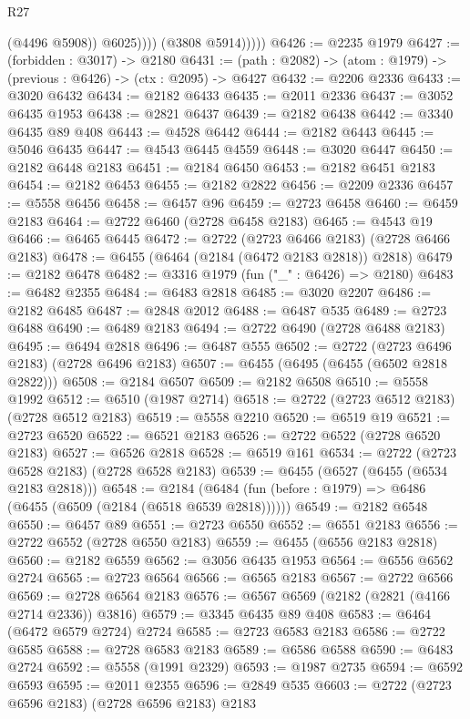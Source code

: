 \begin{lexlean}{R27}
\begin{coremodule}
                      (@4496 @5908))
                    @6025))))
            (@3808 @5914)))))
@6426 := @2235 @1979
@6427 := (forbidden : @3017) -> @2180
@6431 := (path : @2082) -> (atom : @1979) -> (previous : @6426) -> (ctx : @2095) -> @6427
@6432 := @2206 @2336
@6433 := @3020 @6432
@6434 := @2182 @6433
@6435 := @2011 @2336
@6437 := @3052 @6435 @1953
@6438 := @2821 @6437
@6439 := @2182 @6438
@6442 := @3340 @6435 @89 @408
@6443 := @4528 @6442
@6444 := @2182 @6443
@6445 := @5046 @6435
@6447 := @4543 @6445 @4559
@6448 := @3020 @6447
@6450 := @2182 @6448 @2183
@6451 := @2184 @6450
@6453 := @2182 @6451 @2183
@6454 := @2182 @6453
@6455 := @2182 @2822
@6456 := @2209 @2336
@6457 := @5558 @6456
@6458 := @6457 @96
@6459 := @2723 @6458
@6460 := @6459 @2183
@6464 := @2722 @6460 (@2728 @6458 @2183)
@6465 := @4543 @19
@6466 := @6465 @6445
@6472 := @2722 (@2723 @6466 @2183) (@2728 @6466 @2183)
@6478 := @6455 (@6464 (@2184 (@6472 @2183 @2818)) @2818)
@6479 := @2182 @6478
@6482 := @3316 @1979 (fun ("_" : @6426) => @2180)
@6483 := @6482 @2355
@6484 := @6483 @2818
@6485 := @3020 @2207
@6486 := @2182 @6485
@6487 := @2848 @2012
@6488 := @6487 @535
@6489 := @2723 @6488
@6490 := @6489 @2183
@6494 := @2722 @6490 (@2728 @6488 @2183)
@6495 := @6494 @2818
@6496 := @6487 @555
@6502 := @2722 (@2723 @6496 @2183) (@2728 @6496 @2183)
@6507 := @6455 (@6495 (@6455 (@6502 @2818 @2822)))
@6508 := @2184 @6507
@6509 := @2182 @6508
@6510 := @5558 @1992
@6512 := @6510 (@1987 @2714)
@6518 := @2722 (@2723 @6512 @2183) (@2728 @6512 @2183)
@6519 := @5558 @2210
@6520 := @6519 @19
@6521 := @2723 @6520
@6522 := @6521 @2183
@6526 := @2722 @6522 (@2728 @6520 @2183)
@6527 := @6526 @2818
@6528 := @6519 @161
@6534 := @2722 (@2723 @6528 @2183) (@2728 @6528 @2183)
@6539 := @6455 (@6527 (@6455 (@6534 @2183 @2818)))
@6548 := @2184 (@6484 (fun (before : @1979) => @6486 (@6455 (@6509 (@2184 (@6518 @6539 @2818))))))
@6549 := @2182 @6548
@6550 := @6457 @89
@6551 := @2723 @6550
@6552 := @6551 @2183
@6556 := @2722 @6552 (@2728 @6550 @2183)
@6559 := @6455 (@6556 @2183 @2818)
@6560 := @2182 @6559
@6562 := @3056 @6435 @1953
@6564 := @6556 @6562 @2724
@6565 := @2723 @6564
@6566 := @6565 @2183
@6567 := @2722 @6566
@6569 := @2728 @6564 @2183
@6576 := @6567 @6569 (@2182 (@2821 (@4166 @2714 @2336)) @3816)
@6579 := @3345 @6435 @89 @408
@6583 := @6464 (@6472 @6579 @2724) @2724
@6585 := @2723 @6583 @2183
@6586 := @2722 @6585
@6588 := @2728 @6583 @2183
@6589 := @6586 @6588
@6590 := @6483 @2724
@6592 := @5558 (@1991 @2329)
@6593 := @1987 @2735
@6594 := @6592 @6593
@6595 := @2011 @2355
@6596 := @2849 @535
@6603 := @2722 (@2723 @6596 @2183) (@2728 @6596 @2183) @2183

\end{coremodule}
\end{lexlean}
